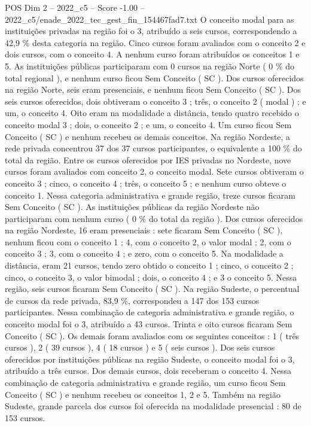 \begin{textsample}{POS Dim 2 – 2022\_c5 – Score -1.00 – 2022\_c5/enade\_2022\_tec\_gest\_fin\_154467fad7.txt}
O conceito modal para as instituições privadas na região foi o 3, atribuído a seis cursos, correspondendo a 42,9 \% desta categoria na região.
Cinco cursos foram avaliados com o conceito 2 e dois cursos, com o conceito 4.
A nenhum curso foram atribuídos os conceitos 1 e 5.
As instituições públicas participaram com 0 cursos na região Norte ( 0 \% do total regional ), e nenhum curso ficou Sem Conceito ( SC ).
Dos cursos oferecidos na região Norte, seis eram presenciais, e nenhum ficou Sem Conceito ( SC ).
Dos seis cursos oferecidos, dois obtiveram o conceito 3 ; três, o conceito 2 ( modal ) ; e um, o conceito 4.
Oito eram na modalidade a distância, tendo quatro recebido o conceito modal 3 ; dois, o conceito 2 ; e um, o conceito 4.
Um curso ficou Sem Conceito ( SC ) e nenhum recebeu os demais conceitos.
Na região Nordeste, a rede privada concentrou 37 dos 37 cursos participantes, o equivalente a 100 \% do total da região.
Entre os cursos oferecidos por IES privadas no Nordeste, nove cursos foram avaliados com conceito 2, o conceito modal.
Sete cursos obtiveram o conceito 3 ; cinco, o conceito 4 ; três, o conceito 5 ; e nenhum curso obteve o conceito 1.
Nessa categoria administrativa e grande região, treze cursos ficaram Sem Conceito ( SC ).
As instituições públicas da região Nordeste não participaram com nenhum curso ( 0 \% do total da região ).
Dos cursos oferecidos na região Nordeste, 16 eram presenciais : sete ficaram Sem Conceito ( SC ), nenhum ficou com o conceito 1 ; 4, com o conceito 2, o valor modal ; 2, com o conceito 3 ; 3, com o conceito 4 ; e zero, com o conceito 5.
Na modalidade a distância, eram 21 cursos, tendo zero obtido o conceito 1 ; cinco, o conceito 2 ; cinco, o conceito 3, o valor bimodal ; dois, o conceito 4 ; e 3 o conceito 5.
Nessa região, seis cursos ficaram Sem Conceito ( SC ).
Na região Sudeste, o percentual de cursos da rede privada, 83,9 \%, correspondeu a 147 dos 153 cursos participantes.
Nessa combinação de categoria administrativa e grande região, o conceito modal foi o 3, atribuído a 43 cursos.
Trinta e oito cursos ficaram Sem Conceito ( SC ).
Os demais foram avaliados com os seguintes conceitos : 1 ( três cursos ), 2 ( 39 cursos ), 4 ( 18 cursos ) e 5 ( seis cursos ).
Dos seis cursos oferecidos por instituições públicas na região Sudeste, o conceito modal foi o 3, atribuído a três cursos.
Dos demais cursos, dois receberam o conceito 4.
Nessa combinação de categoria administrativa e grande região, um curso ficou Sem Conceito ( SC ) e nenhum recebeu os conceitos 1, 2 e 5.
Também na região Sudeste, grande parcela dos cursos foi oferecida na modalidade presencial : 80 de 153 cursos.

\end{textsample}
